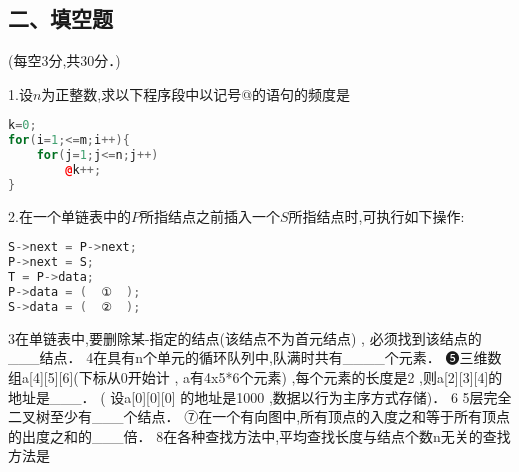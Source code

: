 \subsection{二、填空题}
(每空3分,共30分．)

1.设$n$为正整数,求以下程序段中以记号@的语句的频度是 \\
\begin{lstlisting}[language=cpp]
k=0;
for(i=1;<=m;i++){
    for(j=1;j<=n;j++)
        @k++;
}
\end{lstlisting}

2.在一个单链表中的$P$所指结点之前插入一个$S$所指结点时,可执行如下操作:  \\
\begin{lstlisting}[language=cpp]
S->next = P->next;
P->next = S;
T = P->data;
P->data = (  ①  );
S->data = (  ②  );
\end{lstlisting}

3在单链表中,要删除某-指定的结点(该结点不为首元结点) , 必须找到该结点的
___结点．
4在具有n个单元的循环队列中,队满时共有____个元素．
❺三维数组a[4][5][6](下标从0开始计 , a有4x5*6个元素) ,每个元素的长度是2 ,则a[2][3][4]的地址是___． ( 设a[0][0][0]
的地址是1000 ,数据以行为主序方式存储)．
6 5层完全二叉树至少有___个结点．
⑦在一个有向图中,所有顶点的入度之和等于所有顶点的出度之和的___倍．
8在各种查找方法中,平均查找长度与结点个数n无关的查找方法是
